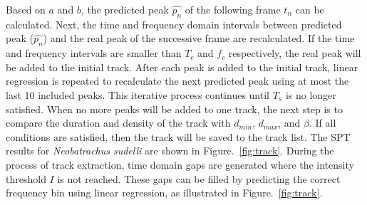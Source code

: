Based on $a$ and $b$, the predicted peak $\hat{p_{n}}$ of the following frame $t_{n}$ can be calculated. 
Next, the time and frequency domain intervals between predicted peak ($\hat{p_{n}}$) and the real peak of the successive frame are recalculated. If the time and frequency intervals are smaller than $T_{c}$ and $f_{c}$ respectively, the real peak will be added to the initial track. After each peak is added to the initial track, linear regression is repeated to recalculate the next predicted peak using at most the last 10 included peaks. This iterative process continues until $T_{s}$ is no longer satisfied. 
When no more peaks will be added to one track, the next step is to compare the duration and density of the track with $d_{min}$, $d_{max}$, and $\beta$. If all conditions are satisfied, then the track will be saved to the track list. The SPT results for \textit{Neobatrachus sudelli} are shown in
Figure.~\ref{fig:track}. During the process of track extraction, time domain gaps  are generated where the intensity threshold $I$ is not reached.
These gaps can be filled by predicting the correct frequency
bin using linear regression, as illustrated in Figure.~\ref{fig:track}. 

